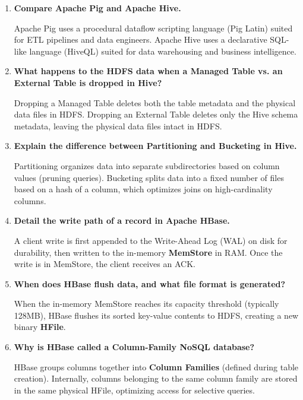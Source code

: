 \documentclass[12pt,a4paper]{article}
\newcommand{\Q}[1]{\textbf{#1}\par\noindent\ignorespaces}
\begin{document}
\vspace{6pt}

\begin{tcolorbox}[exambox, title={\textbf{Frequently Asked / Viva Questions}}]
\begin{enumerate}[leftmargin=*, topsep=0pt, label=\textbf{Q\arabic*.}, itemsep=5pt]
  \item \Q{Compare Apache Pig and Apache Hive.}
        Apache Pig uses a procedural dataflow scripting language (Pig Latin) suited for ETL pipelines and data engineers. Apache Hive uses a declarative SQL-like language (HiveQL) suited for data warehousing and business intelligence.
        
  \item \Q{What happens to the HDFS data when a Managed Table vs. an External Table is dropped in Hive?}
        Dropping a Managed Table deletes both the table metadata and the physical data files in HDFS. Dropping an External Table deletes only the Hive schema metadata, leaving the physical data files intact in HDFS.
        
  \item \Q{Explain the difference between Partitioning and Bucketing in Hive.}
        Partitioning organizes data into separate subdirectories based on column values (pruning queries). Bucketing splits data into a fixed number of files based on a hash of a column, which optimizes joins on high-cardinality columns.
        
  \item \Q{Detail the write path of a record in Apache HBase.}
        A client write is first appended to the Write-Ahead Log (WAL) on disk for durability, then written to the in-memory \textbf{MemStore} in RAM. Once the write is in MemStore, the client receives an ACK.
        
  \item \Q{When does HBase flush data, and what file format is generated?}
        When the in-memory MemStore reaches its capacity threshold (typically 128MB), HBase flushes its sorted key-value contents to HDFS, creating a new binary \textbf{HFile}.
        
  \item \Q{Why is HBase called a Column-Family NoSQL database?}
        HBase groups columns together into \textbf{Column Families} (defined during table creation). Internally, columns belonging to the same column family are stored in the same physical HFile, optimizing access for selective queries.
        

\end{enumerate}
\end{tcolorbox}
\end{document}
